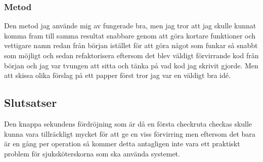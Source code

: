\subsubsection{Metod}
Den metod jag använde mig av fungerade bra, men jag tror att jag skulle kunnat komma fram till samma resultat snabbare genom att göra kortare funktioner och vettigare namn redan från början istället för att göra något som funkar så snabbt som möjligt och sedan refaktorisera eftersom det blev väldigt förvirrande kod från början och jag var tvungen att sitta och tänka på vad kod jag skrivit gjorde. Men att skissa olika förslag på ett papper först tror jag var en väldigt bra idé.

\subsection{Slutsatser}
Den knappa sekundens fördröjning som är då en första checkruta checkas skulle kunna vara tillräckligt mycket för att ge en viss förvirring men eftersom det bara är en gång per operation så kommer detta antagligen inte vara ett praktiskt problem för sjuksköterskorna som ska använda systemet. 